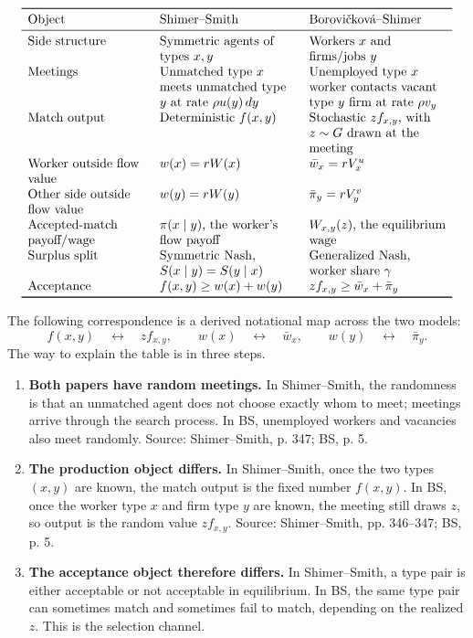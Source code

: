 ﻿\documentclass[11pt]{article}
\newcommand{\1}{\mathbf{1}}
\begin{document}
\[
\begin{array}{>{\raggedright\arraybackslash}p{0.27\linewidth}
                >{\raggedright\arraybackslash}p{0.31\linewidth}
                >{\raggedright\arraybackslash}p{0.31\linewidth}}
\toprule
Object & Shimer--Smith & Borovi\v{c}kov\'a--Shimer \\
\midrule
Side structure & Symmetric agents of types $x,y$ & Workers $x$ and firms/jobs $y$ \\
Meetings & Unmatched type $x$ meets unmatched type $y$ at rate
$\rho u(y)\,dy$ & Unemployed type $x$ worker contacts vacant type $y$ firm at
rate $\rho v_y$ \\
Match output & Deterministic $f(x,y)$ & Stochastic $z f_{x,y}$, with $z\sim G$ drawn at the meeting \\
Worker outside flow value & $w(x)=rW(x)$ & $\bar w_x=rV_x^u$ \\
Other side outside flow value & $w(y)=rW(y)$ & $\bar\pi_y=rV_y^v$ \\
Accepted-match payoff/wage & $\pi(x\mid y)$, the worker's flow payoff & $W_{x,y}(z)$, the equilibrium wage \\
Surplus split & Symmetric Nash, $S(x\mid y)=S(y\mid x)$ & Generalized Nash, worker share $\gamma$ \\
Acceptance & $f(x,y)\geq w(x)+w(y)$ & $z f_{x,y}\geq \bar w_x+\bar\pi_y$ \\
\bottomrule
\end{array}
\]

The following correspondence is a derived notational map across the two models:
\[
f(x,y)
\quad\longleftrightarrow\quad
z f_{x,y},
\qquad
w(x)
\quad\longleftrightarrow\quad
\bar w_x,
\qquad
w(y)
\quad\longleftrightarrow\quad
\bar\pi_y.
\]
The way to explain the table is in three steps.

\begin{enumerate}
\item \textbf{Both papers have random meetings.} In Shimer--Smith, the randomness is
that an unmatched agent does not choose exactly whom to meet; meetings arrive through
the search process. In BS, unemployed workers and vacancies also meet randomly. Source:
Shimer--Smith, p. 347; BS, p. 5.

\item \textbf{The production object differs.} In Shimer--Smith, once the two types
$(x,y)$ are known, the match output is the fixed number $f(x,y)$. In BS, once the
worker type $x$ and firm type $y$ are known, the meeting still draws $z$, so output is
the random value $zf_{x,y}$. Source: Shimer--Smith, pp. 346--347; BS, p. 5.

\item \textbf{The acceptance object therefore differs.} In Shimer--Smith, a type pair is
either acceptable or not acceptable in equilibrium. In BS, the same type pair can sometimes
match and sometimes fail to match, depending on the realized $z$. This is the selection
channel.
\end{enumerate}
\end{document}
